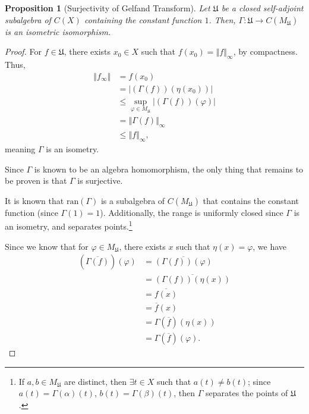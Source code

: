 \documentclass[10pt]{extarticle}
\newcommand{\norm}[1]{\left\Vert #1\right\Vert}
\theoremstyle{plain}
\newtheorem*{proposition}{Proposition}
\theoremstyle{definition}
\theoremstyle{note}
\renewcommand{\newline}{\hfill\break}
\begin{document}
\begin{proposition}[Surjectivity of Gelfand Transform]
  Let $\mathfrak{U}$ be a closed self-adjoint subalgebra of $C(X)$ containing the constant function $1$. Then, $\Gamma: \mathfrak{U} \rightarrow C\left(M_{\mathfrak{U}}\right)$ is an isometric isomorphism.
\end{proposition}
\begin{proof}
  For $f\in \mathfrak{U}$, there exists $x_0 \in X$ such that $f\left(x_0\right) = \norm{f}_{\infty}$, by compactness. Thus,
  \begin{align*}
    \norm{f_{\infty}} &= f\left(x_0\right)\\
                      &= \left\vert \left(\Gamma(f)\right)\left(\eta\left(x_0\right)\right) \right\vert\\
                      &\leq \sup_{\varphi \in M_{\mathfrak{U}}}\left\vert \left(\Gamma(f)\right)(\varphi) \right\vert\\
                      &= \norm{\Gamma(f)}_{\infty}\\
                      &\leq \norm{f}_{\infty},
  \end{align*}
  meaning $\Gamma$ is an isometry.\newline

  Since $\Gamma$ is known to be an algebra homomorphism, the only thing that remains to be proven is that $\Gamma$ is surjective.\newline

  It is known that $\text{ran}\left(\Gamma\right)$ is a subalgebra of $C\left(M_{\mathfrak{U}}\right)$ that contains the constant function (since $\Gamma(1) = 1$). Additionally, the range is uniformly closed since $\Gamma$ is an isometry, and separates points.\footnote{If $a,b\in M_{\mathfrak{U}}$ are distinct, then $\exists t\in X$ such that $a(t)\neq b(t)$; since $a(t) = \Gamma(\alpha)(t)$, $b(t) = \Gamma(\beta)(t)$, then $\Gamma$ separates the points of $\mathfrak{U}$.}\newline

  Since we know that for $\varphi \in M_{\mathfrak{U}}$, there exists $x$ such that $\eta(x) = \varphi$, we have
  \begin{align*}
    \left(\overline{\Gamma(f)}\right)\left(\varphi\right) &= \overline{\left(\Gamma(f)\right)\left(\varphi\right)}\\
                                                          &= \overline{\left(\Gamma(f)\right)\left(\eta(x)\right)}\\
                                                          &= \overline{f(x)}\\
                                                          &= \overline{f}(x)\\
                                                    &= \Gamma\left(\overline{f}\right)\left(\eta(x)\right)\\
                                                    &= \Gamma\left(\overline{f}\right)\left(\varphi\right).
  \end{align*}
\end{proof}
\end{document}

